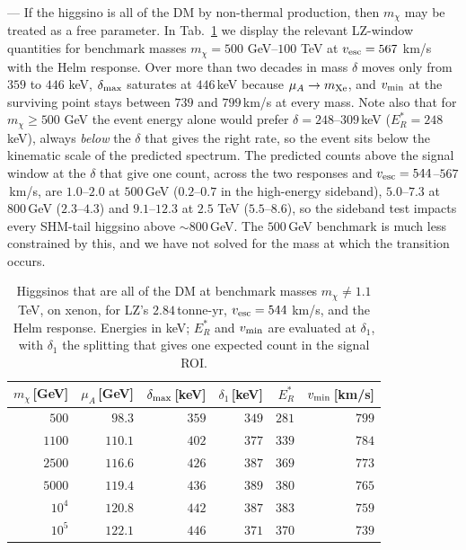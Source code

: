 \documentclass[reprint,superscriptaddress,preprintnumbers,amsmath,amssymb,aps,prd,tightenlines,longbibliography,nofootinbib]{revtex4-2}
\begin{document}
\appendix

\makeatletter
\par{}---\nobreak\ignorespaces
\makeatother
%
If the higgsino is all of the DM by non-thermal production, then $m_\chi$ may be treated as a free parameter. In Tab.~\ref{tab:mass} we display the relevant LZ-window quantities for benchmark masses $m_\chi = 500$ GeV--$100$ TeV at $v_{\rm esc} = 567$ km/s with the Helm response.
Over more than two decades in mass $\delta$ moves only from $359$ to $446$ keV, $\delta_{\rm max}$ saturates at $446$\,keV because $\mu_A \to m_{\rm Xe}$, and $v_{\rm min}$ at the surviving point stays between $739$ and $799$\,km/s at every mass. 
Note also that for $m_\chi \geq 500$ GeV the event energy alone would prefer $\delta = 248$--$309$\,keV ($E_R^* = 248$\,keV), always \emph{below} the $\delta$ that gives the right rate, so the event sits below the kinematic scale of the predicted spectrum. The predicted counts above the signal window at the $\delta$ that give one count, across the two responses and $v_{\rm esc} = 544$--$567$\,km/s, are $1.0$--$2.0$ at $500$\,GeV ($0.2$--$0.7$ in the high-energy sideband), $5.0$--$7.3$ at $800$\,GeV ($2.3$--$4.3$) and $9.1$--$12.3$ at $2.5$ TeV ($5.5$--$8.6$), so the sideband test impacts every SHM-tail higgsino above $\sim\!800$\,GeV. The $500$\,GeV benchmark is much less constrained by this, and we have not solved for the mass at which the transition occurs.  

\begin{table}[b]
\centering
\footnotesize
\setlength{\tabcolsep}{4.5pt}
\begin{tabular}{rrrrrr}
\toprule
$m_\chi$\,[GeV] & $\mu_A$\,[GeV] & $\delta_{\rm max}$\,[keV] & $\delta_1$\,[keV] & $E_R^*$ & $v_{\rm min}$\,[km/s] \\
\midrule
$500$ & $98.3$ & $359$ & $349$ & $281$ & $799$ \\
$1100$ & $110.1$ & $402$ & $377$ & $339$ & $784$ \\
$2500$ & $116.6$ & $426$ & $387$ & $369$ & $773$ \\
$5000$ & $119.4$ & $436$ & $389$ & $380$ & $765$ \\
$10^4$ & $120.8$ & $442$ & $387$ & $383$ & $759$ \\
$10^5$ & $122.1$ & $446$ & $371$ & $370$ & $739$ \\
\bottomrule
\end{tabular}
\caption{Higgsinos that are all of the DM at benchmark masses $m_\chi \neq 1.1$ TeV, on xenon, for LZ's $2.84$\,tonne-yr, $v_{\rm esc} = 544$ km/s, and the Helm response. Energies in keV; $E_R^*$ and $v_{\rm min}$ are evaluated at $\delta_1$, with $\delta_1$ the splitting that gives one expected count in the signal ROI.}
\label{tab:mass}
\end{table}
\end{document}
